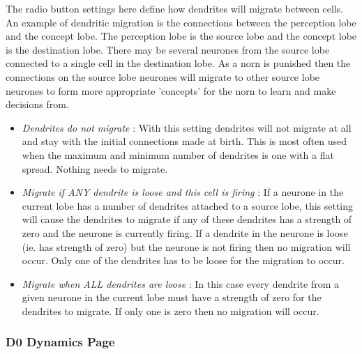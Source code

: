 \documentclass[11pt,twoside,a4paper]{article}
\begin{document}
The radio button settings here define how dendrites will migrate between cells. An example of dendritic migration is the connections between the perception lobe and the concept lobe. The perception lobe is the source lobe and the concept lobe is the destination lobe. There may be several neurones from the source lobe connected to a single cell in the destination lobe. As a norn is punished then the connections on the source lobe neurones will migrate to other source lobe neurones to form more appropriate 'concepts' for the norn to learn and make decisions from. 
\begin{itemize}
	\item[] \emph{Dendrites do not migrate} : With this setting dendrites will not migrate at all and stay with the initial connections made at birth. This is most often used when the maximum and minimum number of dendrites is one with a flat spread. Nothing needs to migrate.
	\item[] \emph{Migrate if ANY dendrite is loose and this cell is firing} : If a neurone in the current lobe has a number of dendrites attached to a source lobe, this setting will cause the dendrites to migrate if any of these dendrites has a strength of zero and the neurone is currently firing. If a dendrite in the neurone is loose (ie. has strength of zero) but the neurone is not firing then no migration will occur. Only one of the dendrites has to be loose for the migration to occur.
	\item[] \emph{Migrate when ALL dendrites are loose} : In this case every dendrite from a given neurone in the current lobe must have a strength of zero for the dendrites to migrate. If only one is zero then no migration will occur.
\end{itemize}


\subsubsection{D0 Dynamics Page}
\end{document}
